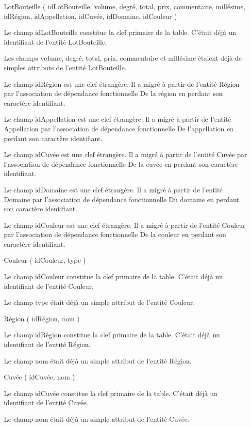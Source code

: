 \documentclass[11pt]{article}
\begin{document}
{LotBouteille} ( {idLotBouteille}, {volume}, {degré}, {total}, {prix},
{commentaire}, {millésime}, {idRégion}, {idAppellation}, {idCuvée},
{idDomaine}, {idCouleur} )

Le champ idLotBouteille constitue la clef primaire de la table. C'était
déjà un identifiant de l'entité LotBouteille.

Les champs volume, degré, total, prix, commentaire et millésime étaient
déjà de simples attributs de l'entité LotBouteille.

Le champ idRégion est une clef étrangère. Il a migré à partir de
l'entité Région par l'association de dépendance fonctionnelle De la
région en perdant son caractère identifiant.

Le champ idAppellation est une clef étrangère. Il a migré à partir de
l'entité Appellation par l'association de dépendance fonctionnelle De
l'appellation en perdant son caractère identifiant.

Le champ idCuvée est une clef étrangère. Il a migré à partir de l'entité
Cuvée par l'association de dépendance fonctionnelle De la cuvée en
perdant son caractère identifiant.

Le champ idDomaine est une clef étrangère. Il a migré à partir de
l'entité Domaine par l'association de dépendance fonctionnelle Du
domaine en perdant son caractère identifiant.

Le champ idCouleur est une clef étrangère. Il a migré à partir de
l'entité Couleur par l'association de dépendance fonctionnelle De la
couleur en perdant son caractère identifiant.

{Couleur} ( {idCouleur}, {type} )

Le champ idCouleur constitue la clef primaire de la table. C'était déjà
un identifiant de l'entité Couleur.

Le champ type était déjà un simple attribut de l'entité Couleur.

{Région} ( {idRégion}, {nom} )

Le champ idRégion constitue la clef primaire de la table. C'était déjà
un identifiant de l'entité Région.

Le champ nom était déjà un simple attribut de l'entité Région.

{Cuvée} ( {idCuvée}, {nom} )

Le champ idCuvée constitue la clef primaire de la table. C'était déjà un
identifiant de l'entité Cuvée.

Le champ nom était déjà un simple attribut de l'entité Cuvée.
\end{document}
